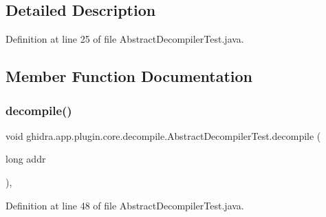 \subsection{Detailed Description}


Definition at line 25 of file Abstract\+Decompiler\+Test.\+java.



\subsection{Member Function Documentation}
\mbox{\label{classghidra_1_1app_1_1plugin_1_1core_1_1decompile_1_1_abstract_decompiler_test_a9d26f26311f687312c38172ea301e048}} 
\subsubsection{\texorpdfstring{decompile()}{decompile()}\hspace{0.1cm}{\footnotesize\ttfamily [1/2]}}
{\footnotesize\ttfamily void ghidra.\+app.\+plugin.\+core.\+decompile.\+Abstract\+Decompiler\+Test.\+decompile (\begin{DoxyParamCaption}\item[{long}]{addr }\end{DoxyParamCaption})\hspace{0.3cm}{\ttfamily [inline]}, {\ttfamily [protected]}}



Definition at line 48 of file Abstract\+Decompiler\+Test.\+java.

